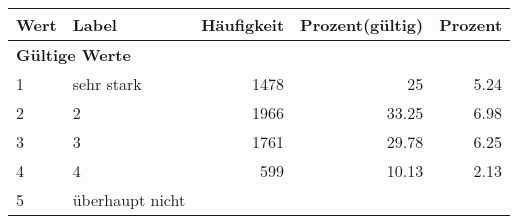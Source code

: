      \begin{longtable}{lXrrr}
     \toprule
     \textbf{Wert} & \textbf{Label} & \textbf{Häufigkeit} & \textbf{Prozent(gültig)} & \textbf{Prozent} \\
     \endhead
     \midrule
     \multicolumn{5}{l}{\textbf{Gültige Werte}}\\

     1 &
     \multicolumn{1}{X}{ sehr stark   } &


       \num{1478} &
       \num[round-mode=places,round-precision=2]{25} &
         \num[round-mode=places,round-precision=2]{5.24} \\

     2 &
     \multicolumn{1}{X}{ 2   } &


       \num{1966} &
       \num[round-mode=places,round-precision=2]{33.25} &
         \num[round-mode=places,round-precision=2]{6.98} \\

     3 &
     \multicolumn{1}{X}{ 3   } &


       \num{1761} &
       \num[round-mode=places,round-precision=2]{29.78} &
         \num[round-mode=places,round-precision=2]{6.25} \\

     4 &
     \multicolumn{1}{X}{ 4   } &


       \num{599} &
       \num[round-mode=places,round-precision=2]{10.13} &
         \num[round-mode=places,round-precision=2]{2.13} \\

     5 &
     \multicolumn{1}{X}{ überhaupt nicht   } &



\end{longtable}
